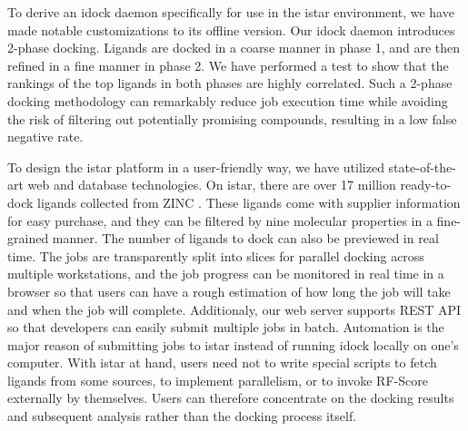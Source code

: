 \documentclass[10pt]{article}
\begin{document}
To derive an idock daemon specifically for use in the istar environment, we have made notable customizations to its offline version. Our idock daemon introduces 2-phase docking. Ligands are docked in a coarse manner in phase 1, and are then refined in a fine manner in phase 2. We have performed a test to show that the rankings of the top ligands in both phases are highly correlated. Such a 2-phase docking methodology can remarkably reduce job execution time while avoiding the risk of filtering out potentially promising compounds, resulting in a low false negative rate.

To design the istar platform in a user-friendly way, we have utilized state-of-the-art web and database technologies. On istar, there are over 17 million ready-to-dock ligands collected from ZINC \cite{532,1178}. These ligands come with supplier information for easy purchase, and they can be filtered by nine molecular properties in a fine-grained manner. The number of ligands to dock can also be previewed in real time. The jobs are transparently split into slices for parallel docking across multiple workstations, and the job progress can be monitored in real time in a browser so that users can have a rough estimation of how long the job will take and when the job will complete. Additionaly, our web server supports REST API so that developers can easily submit multiple jobs in batch. Automation is the major reason of submitting jobs to istar instead of running idock locally on one's computer. With istar at hand, users need not to write special scripts to fetch ligands from some sources, to implement parallelism, or to invoke RF-Score externally by themselves. Users can therefore concentrate on the docking results and subsequent analysis rather than the docking process itself.
\end{document}
